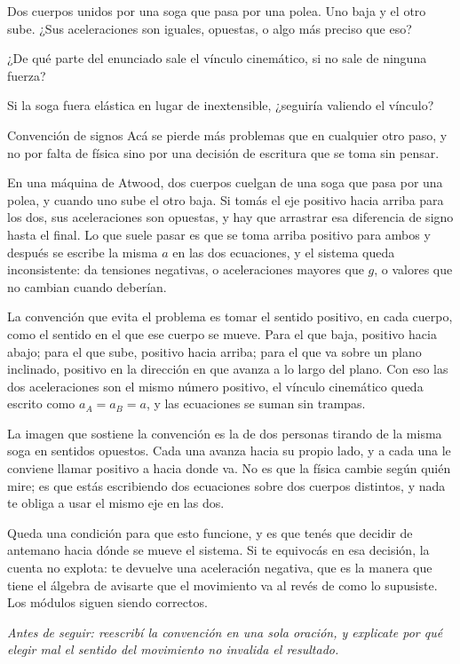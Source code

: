 \documentclass[11pt,openany]{book}
\begin{document}
\begin{chequeo}
\item Dos cuerpos unidos por una soga que pasa por una polea. Uno baja y el otro sube. ¿Sus aceleraciones son iguales, opuestas, o algo más preciso que eso?
\item ¿De qué parte del enunciado sale el vínculo cinemático, si no sale de ninguna fuerza?
\item Si la soga fuera elástica en lugar de inextensible, ¿seguiría valiendo el vínculo?
\end{chequeo}

\begin{bloque}{Convención de signos}
Acá se pierde más problemas que en cualquier otro paso, y no por falta de física sino por una decisión de escritura que se toma sin pensar.

En una máquina de Atwood, dos cuerpos cuelgan de una soga que pasa por una polea, y cuando uno sube el otro baja. Si tomás el eje positivo hacia arriba para los dos, sus aceleraciones son opuestas, y hay que arrastrar esa diferencia de signo hasta el final. Lo que suele pasar es que se toma arriba positivo para ambos y después se escribe la misma $a$ en las dos ecuaciones, y el sistema queda inconsistente: da tensiones negativas, o aceleraciones mayores que $g$, o valores que no cambian cuando deberían.

La convención que evita el problema es tomar el sentido positivo, en cada cuerpo, como el sentido en el que ese cuerpo se mueve. Para el que baja, positivo hacia abajo; para el que sube, positivo hacia arriba; para el que va sobre un plano inclinado, positivo en la dirección en que avanza a lo largo del plano. Con eso las dos aceleraciones son el mismo número positivo, el vínculo cinemático queda escrito como $a_A = a_B = a$, y las ecuaciones se suman sin trampas.

La imagen que sostiene la convención es la de dos personas tirando de la misma soga en sentidos opuestos. Cada una avanza hacia su propio lado, y a cada una le conviene llamar positivo a hacia donde va. No es que la física cambie según quién mire; es que estás escribiendo dos ecuaciones sobre dos cuerpos distintos, y nada te obliga a usar el mismo eje en las dos.

Queda una condición para que esto funcione, y es que tenés que decidir de antemano hacia dónde se mueve el sistema. Si te equivocás en esa decisión, la cuenta no explota: te devuelve una aceleración negativa, que es la manera que tiene el álgebra de avisarte que el movimiento va al revés de como lo supusiste. Los módulos siguen siendo correctos.

\textit{Antes de seguir: reescribí la convención en una sola oración, y explicate por qué elegir mal el sentido del movimiento no invalida el resultado.}
\end{bloque}
\end{document}
